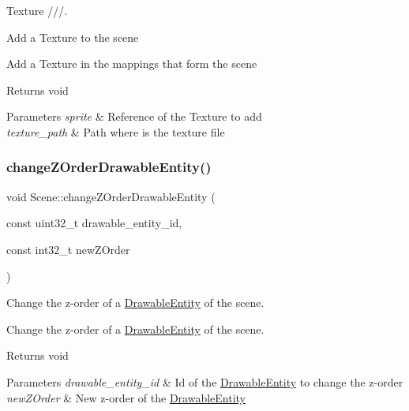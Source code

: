 Texture ///. 

Add a Texture to the scene

Add a Texture in the mappings that form the scene

\begin{DoxyReturn}{Returns}
void 
\end{DoxyReturn}

\begin{DoxyParams}{Parameters}
{\em sprite} & Reference of the Texture to add \\
\hline
{\em texture\+\_\+path} & Path where is the texture file \\
\hline
\end{DoxyParams}
\mbox{\label{class_scene_abf79f183e4780f8c256238abb9f8a1b0}} 
\subsubsection{\texorpdfstring{change\+Z\+Order\+Drawable\+Entity()}{changeZOrderDrawableEntity()}}
{\footnotesize\ttfamily void Scene\+::change\+Z\+Order\+Drawable\+Entity (\begin{DoxyParamCaption}\item[{const uint32\+\_\+t}]{drawable\+\_\+entity\+\_\+id,  }\item[{const int32\+\_\+t}]{new\+Z\+Order }\end{DoxyParamCaption})}



Change the z-\/order of a \hyperlink{class_drawable_entity}{Drawable\+Entity} of the scene. 

Change the z-\/order of a \hyperlink{class_drawable_entity}{Drawable\+Entity} of the scene.

\begin{DoxyReturn}{Returns}
void 
\end{DoxyReturn}

\begin{DoxyParams}{Parameters}
{\em drawable\+\_\+entity\+\_\+id} & Id of the \hyperlink{class_drawable_entity}{Drawable\+Entity} to change the z-\/order \\
\hline
{\em new\+Z\+Order} & New z-\/order of the \hyperlink{class_drawable_entity}{Drawable\+Entity} \\
\hline
\end{DoxyParams}
\mbox{\label{class_scene_ab4e853e94e486af7dcd0d74434453a8e}} 
